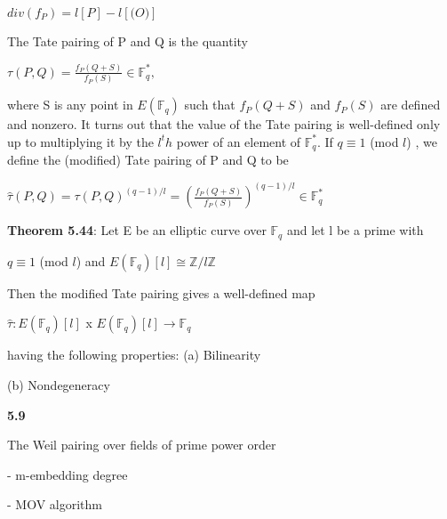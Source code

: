 \documentclass[titlepage]{article}
\begin{document}
\begin{center} 

$div(f_P) = l[P] - l[\mathcal(O)]$

\end{center}  

The Tate pairing of P and Q is the quantity 

\begin{center} 
	
	$\tau(P,Q) = \frac{f_P(Q+S)}{f_P(S)} \in \mathbb{F}_{q}^*,$
	
\end{center} 

where S is any point in $E(\mathbb{F}_q)$ such that $f_P(Q+S)$ and $f_P(S)$ are defined and nonzero. It turns out that the value of the Tate pairing is well-defined only up to multiplying it by the $l^th$ power of an element of $\mathbb{F}_q^*$. If $q \equiv 1$ (mod $l$) , we define the (modified) Tate pairing of P and Q to be 

\begin{center} 

$\hat{\tau}(P,Q) = \tau(P,Q)^{(q-1)/l} = (\frac{f_P(Q+S)}{f_P(S)})^{(q-1)/l} \in \mathbb{F}_q^*$

\end{center} 

\textbf{Theorem 5.44}: Let E be an elliptic curve over $\mathbb{F}_q$ and let l be a prime with 

\begin{center} 

$q \equiv 1$ (mod $l$) and $E(\mathbb{F}_q)[l] \cong \mathbb{Z}/l\mathbb{Z}$

\end{center} 

Then the modified Tate pairing gives a well-defined map 

\begin{center} 
$\hat{\tau}: E(\mathbb{F}_q)[l]$ x $E(\mathbb{F}_q)[l] \longrightarrow \mathbb{F}_q$
\end{center} 
having the following properties: 
(a) Bilinearity

(b) Nondegeneracy


\textbf{5.9}

The Weil pairing over fields of prime power order

\hspace{\parindent}- m-embedding degree 

\hspace{\parindent}- MOV algorithm 
\end{document}
